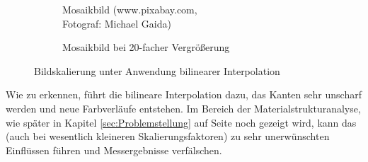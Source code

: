 \documentclass[
fontsize=10pt, 
listof = totoc,
parskip = half	
]{report}
\begin{document}
\begin{figure}[H]
	\begin{subfigure}[t]{0.49\textwidth}
		\centering
		\caption{Mosaikbild (www.pixabay.com,\\ Fotograf: Michael Gaida)}
	\end{subfigure}\hfill
	\begin{subfigure}[t]{0.49\textwidth}
		\centering
		\caption{Mosaikbild bei 20-facher Vergrößerung}
	\end{subfigure}
	\caption{Bildskalierung unter Anwendung bilinearer Interpolation}
	\label{fig:MosaicBilinear}
\end{figure}
\noindent Wie zu erkennen, führt die bilineare Interpolation dazu, das Kanten sehr unscharf werden und neue Farbverläufe entstehen. Im Bereich der Materialstrukturanalyse, wie später in Kapitel \ref{sec:Problemstellung} auf Seite \pageref{sec:Problemstellung} noch gezeigt wird, kann das (auch bei wesentlich kleineren Skalierungsfaktoren) zu sehr unerwünschten Einflüssen führen und Messergebnisse verfälschen.
\end{document}
